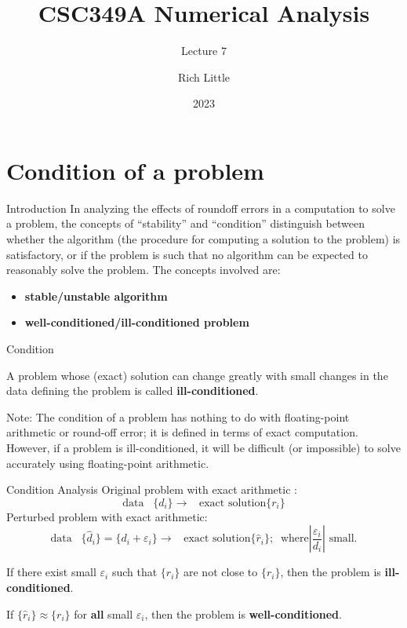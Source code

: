 \documentclass[12pt]{beamer}
\title[CSC349A Numerical Analysis]{CSC349A Numerical Analysis}
\subtitle[Lecture 7]{Lecture 7}
\date[2023]{2023}
\author[|R. Little]{Rich Little}
\institute[University of Victoria]{University of Victoria}
\begin{document}
\frame{\maketitle} %






\section{Condition of a problem} 

\begin{frame}{Introduction} 
In analyzing the effects of roundoff errors in a computation to solve
a problem, the concepts of ``stability'' and ``condition'' distinguish
between whether the algorithm (the procedure for computing a solution
to the problem) is satisfactory, or if the problem is such that no
algorithm can be expected to reasonably solve the problem. The
concepts involved are: 

\begin{itemize} 
\item {\bf stable/unstable algorithm} 
\item {\bf well-conditioned/ill-conditioned problem}
\end{itemize} 
\end{frame}

\begin{frame}{Condition} 

\begin{definition} A problem whose (exact) solution can change greatly with small changes in the data defining the problem is called {\bf ill-conditioned}. 
\end{definition} 

Note: The condition of a problem has nothing to do with floating-point arithmetic or round-off error; it is defined in terms of exact computation. However, if a problem is ill-conditioned, it will be difficult (or impossible) to solve accurately using floating-point arithmetic. 


\end{frame} 

\begin{frame}{Condition Analysis}
Original problem with exact arithmetic : 
\[
\mbox{data} \;\;\; \{d_i\} \rightarrow  \;\;\; \mbox{exact solution} \{r_i\}
\] 
Perturbed problem with exact arithmetic: 
\[ 
\mbox{data} \;\;\; \{\hat d_i\} = \{d_i+\varepsilon_i\} \rightarrow \;\;\; \mbox{exact solution} \{\hat r_i\};\;\; \mbox{where} \left |\frac{\varepsilon_i}{d_i}\right | \mbox{ small}. 
\]


If there exist small $\varepsilon_i$ such that $\{ \hat r_i \}$ are not close to 
$\{ r_i \}$, then the problem is {\bf ill-conditioned}.  

If $\{\hat r_i\} \approx \{ r_i \}$ for {\bf all} small $\varepsilon_i$, then the problem is {\bf well-conditioned}. 
\end{frame} 
\end{document}
